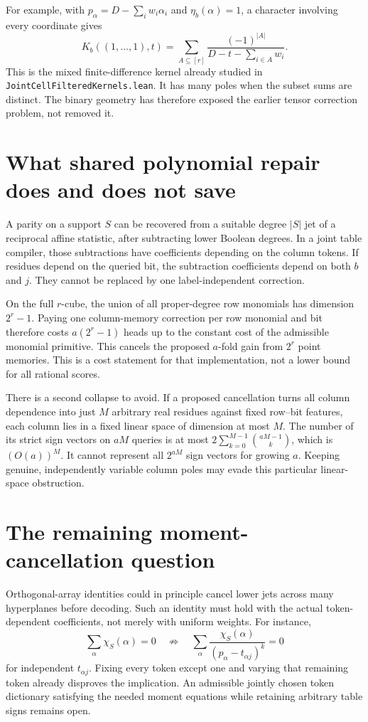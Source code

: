 \documentclass{article}
\begin{document}
For example, with $p_\alpha=D-\sum_i w_i\alpha_i$ and
$\eta_b(\alpha)=1$, a character involving every coordinate gives
\[
 K_b((1,\ldots,1),t)
 =\sum_{A\subseteq[r]}\frac{(-1)^{|A|}}
                             {D-t-\sum_{i\in A}w_i}.
\]
This is the mixed finite-difference kernel already studied in
\texttt{JointCellFilteredKernels.lean}.  It has many poles when the
subset sums are distinct.  The binary geometry has therefore exposed
the earlier tensor correction problem, not removed it.

\section{What shared polynomial repair does and does not save}

A parity on a support $S$ can be recovered from a suitable degree
$|S|$ jet of a reciprocal affine statistic, after subtracting lower
Boolean degrees.  In a joint table compiler, those subtractions have
coefficients depending on the column tokens.  If residues depend on
the queried bit, the subtraction coefficients depend on both $b$ and
$j$.  They cannot be replaced by one label-independent correction.

On the full $r$-cube, the union of all proper-degree row monomials has
dimension $2^r-1$.  Paying one column-memory correction per row
monomial and bit therefore costs $a(2^r-1)$ heads up to the constant
cost of the admissible monomial primitive.  This cancels the proposed
$a$-fold gain from $2^r$ point memories.  This is a cost statement for
that implementation, not a lower bound for all rational scores.

There is a second collapse to avoid.  If a proposed cancellation turns
all column dependence into just $M$ arbitrary real residues against
fixed row--bit features, each column lies in a fixed linear space of
dimension at most $M$.  The number of its strict sign vectors on $aM$
queries is at most $2\sum_{k=0}^{M-1}\binom{aM-1}{k}$, which is
$(O(a))^M$.  It cannot represent all $2^{aM}$ sign vectors for growing
$a$.  Keeping genuine, independently variable column poles may evade
this particular linear-space obstruction.

\section{The remaining moment-cancellation question}

Orthogonal-array identities could in principle cancel lower jets
across many hyperplanes before decoding.  Such an identity must hold
with the actual token-dependent coefficients, not merely with uniform
weights.  For instance,
\[
 \sum_\alpha\chi_S(\alpha)=0
 \quad\not\Longrightarrow\quad
 \sum_\alpha\frac{\chi_S(\alpha)}{(p_\alpha-t_{\alpha j})^k}=0
\]
for independent $t_{\alpha j}$.  Fixing every token except one and
varying that remaining token already disproves the implication.
An admissible jointly chosen token dictionary satisfying the needed
moment equations while retaining arbitrary table signs remains open.
\end{document}
